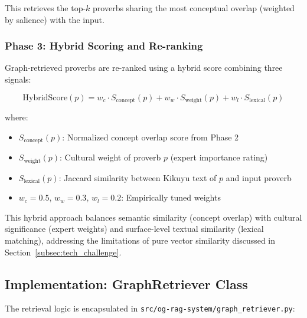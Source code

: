 This retrieves the top-$k$ proverbs sharing the most conceptual overlap (weighted by salience) with the input.

\subsubsection{Phase 3: Hybrid Scoring and Re-ranking}
\label{subsubsec:hybrid_scoring}

Graph-retrieved proverbs are re-ranked using a hybrid score combining three signals:

\begin{equation}
\text{HybridScore}(p) = w_c \cdot S_{\text{concept}}(p) + w_w \cdot S_{\text{weight}}(p) + w_l \cdot S_{\text{lexical}}(p)
\end{equation}

where:
\begin{itemize}
    \item $S_{\text{concept}}(p)$: Normalized concept overlap score from Phase 2
    \item $S_{\text{weight}}(p)$: Cultural weight of proverb $p$ (expert importance rating)
    \item $S_{\text{lexical}}(p)$: Jaccard similarity between Kikuyu text of $p$ and input proverb
    \item $w_c = 0.5$, $w_w = 0.3$, $w_l = 0.2$: Empirically tuned weights
\end{itemize}

This hybrid approach balances semantic similarity (concept overlap) with cultural significance (expert weights) and surface-level textual similarity (lexical matching), addressing the limitations of pure vector similarity discussed in Section~\ref{subsec:tech_challenge}.

\subsection{Implementation: GraphRetriever Class}
\label{subsec:graph_retriever_impl}

The retrieval logic is encapsulated in \texttt{src/og-rag-system/graph\_retriever.py}:

